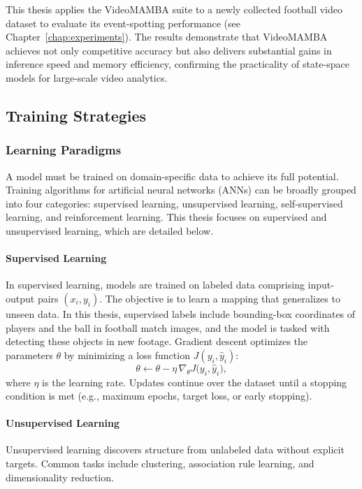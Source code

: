 This thesis applies the VideoMAMBA suite to a newly collected football video dataset to evaluate its event-spotting performance (see Chapter~\ref{chap:experiments}). The results demonstrate that VideoMAMBA achieves not only competitive accuracy but also delivers substantial gains in inference speed and memory efficiency, confirming the practicality of state-space models for large-scale video analytics. 


\subsection{Training Strategies}
\label{ssec:training_stratergies}
\subsubsection{Learning Paradigms}
A model must be trained on domain-specific data to achieve its full potential. Training algorithms for artificial neural networks (ANNs) can be broadly grouped into four categories: supervised learning, unsupervised learning, self-supervised learning, and reinforcement learning. This thesis  focuses on supervised and unsupervised learning, which are detailed below.

\paragraph{Supervised Learning}
In supervised learning, models are trained on labeled data comprising input-output pairs \((x_i, y_i)\). The objective is to learn a mapping that generalizes to unseen data. In this thesis, supervised labels include bounding-box coordinates of players and the ball in football match images, and the model is tasked with detecting these objects in new footage. Gradient descent optimizes the parameters \(\theta\) by minimizing a loss function \(J(y_i, \hat y_i)\):  
\[
\theta \leftarrow \theta - \eta \,\nabla_{\theta}J\bigl(y_i,\hat y_i\bigr),
\]
where \(\eta\) is the learning rate. Updates continue over the dataset until a stopping condition is met (e.g., maximum epochs, target loss, or early stopping).

\paragraph{Unsupervised Learning}
Unsupervised learning discovers structure from unlabeled data without explicit targets. Common tasks include clustering, association rule learning, and dimensionality reduction. 

